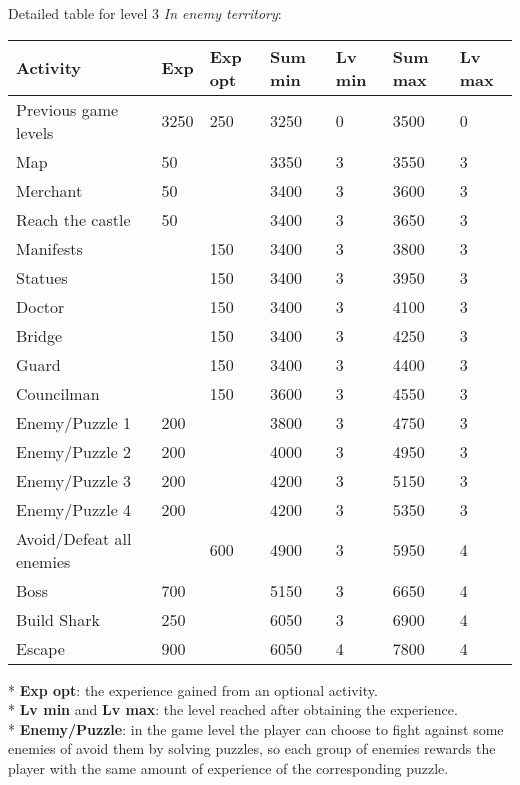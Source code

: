 Detailed table for level 3 \textit{In enemy territory}:
\begin{table}[H]
\centering
\begin{tabular}{|l|l|l|l|l|l|l|}
\hline
\rowcolor[HTML]{C0C0C0} 
\textbf{Activity} & \textbf{Exp} & \textbf{Exp opt} & \textbf{Sum min} & \textbf{Lv min} & \textbf{Sum max} & \textbf{Lv max} \\ \hline
Previous game levels & 3250 & 250 & 3250 & 0 & 3500 & 0 \\ \hline
Map & 50 &  & 3350 & 3 & 3550 & 3 \\ \hline
Merchant & 50 &  & 3400 & 3 & 3600 & 3 \\ \hline
Reach the castle & 50 &  & 3400 & 3 & 3650 & 3 \\ \hline
Manifests &  & 150 & 3400 & 3 & 3800 & 3 \\ \hline
Statues &  & 150 & 3400 & 3 & 3950 & 3 \\ \hline
Doctor &  & 150 & 3400 & 3 & 4100 & 3 \\ \hline
Bridge &  & 150 & 3400 & 3 & 4250 & 3 \\ \hline
Guard &  & 150 & 3400 & 3 & 4400 & 3 \\ \hline
Councilman &  & 150 & 3600 & 3 & 4550 & 3 \\ \hline
Enemy/Puzzle 1 & 200 &  & 3800 & 3 & 4750 & 3 \\ \hline
Enemy/Puzzle 2 & 200 &  & 4000 & 3 & 4950 & 3 \\ \hline
Enemy/Puzzle 3 & 200 &  & 4200 & 3 & 5150 & 3 \\ \hline
Enemy/Puzzle 4 & 200 &  & 4200 & 3 & 5350 & 3 \\ \hline
Avoid/Defeat all enemies &  & 600 & 4900 & 3 & 5950 & 4 \\ \hline
Boss & 700 &  & 5150 & 3 & 6650 & 4 \\ \hline
Build Shark & 250 &  & 6050 & 3 & 6900 & 4 \\ \hline
Escape & 900 &  & 6050 & 4 & 7800 & 4 \\ \hline
\end{tabular}
\end{table}
* \textbf{Exp opt}: the experience gained from an optional activity. \\
* \textbf{Lv min} and \textbf{Lv max}: the level reached after obtaining the experience. \\
* \textbf{Enemy/Puzzle}: in the game level the player can choose to fight against some enemies of avoid them by solving puzzles, so each group of enemies rewards the player with the same amount of experience of the corresponding puzzle.
